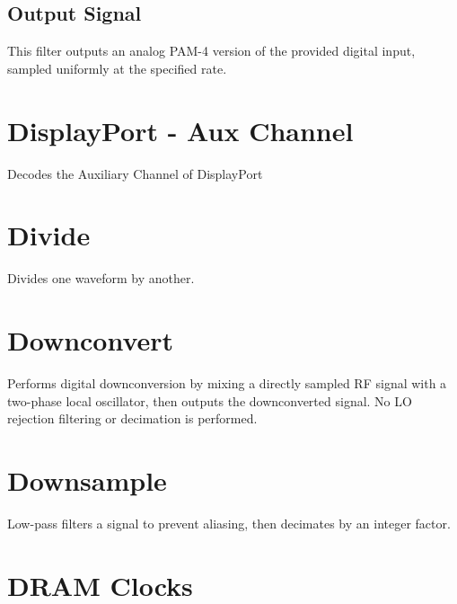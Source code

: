 \subsection{Output Signal}

This filter outputs an analog PAM-4 version of the provided digital input, sampled uniformly at the specified rate.

\pagebreak
\section{DisplayPort - Aux Channel}

Decodes the Auxiliary Channel of DisplayPort

\pagebreak
\section{Divide}

Divides one waveform by another.

\pagebreak
\section{Downconvert}

Performs digital downconversion by mixing a directly sampled RF signal with a two-phase local oscillator, then outputs
the downconverted signal. No LO rejection filtering or decimation is performed.

\pagebreak
\section{Downsample}

Low-pass filters a signal to prevent aliasing, then decimates by an integer factor.

\pagebreak
\section{DRAM Clocks}

